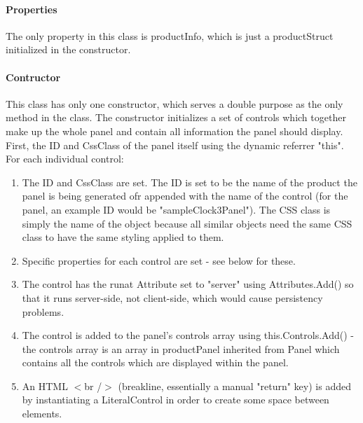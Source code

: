 ﻿\documentclass{article}
\begin{document}
    \paragraph{Properties}
    The only property in this class is productInfo, which is just a productStruct initialized in the constructor.
    \paragraph{Contructor}
    This class has only one constructor, which serves a double purpose as the only method in the class.
    The constructor initializes a set of controls which together make up the whole panel and contain all information the panel should display.
    First, the ID and CssClass of the panel itself using the dynamic referrer "this".
    For each individual control:
    \begin{enumerate}
        \item The ID and CssClass are set.
        The ID is set to be the name of the product the panel is being generated ofr appended with the name of the control (for the panel, an example ID would be "sampleClock3Panel").
        The CSS class is simply the name of the object because all similar objects need the same CSS class to have the same styling applied to them.
        \item Specific properties for each control are set - see below for these.
        \item The control has the runat Attribute set to "server" using Attributes.Add() so that it runs server-side, not client-side, which would cause persistency problems.
        \item The control is added to the panel's controls array using this.Controls.Add() - the controls array is an array in productPanel inherited from Panel which contains all the controls which are displayed within the panel.
        \item An HTML $<$br /$>$ (breakline, essentially a manual "return" key) is added by instantiating a LiteralControl in order to create some space between elements.
    \end{enumerate}
\end{document}
